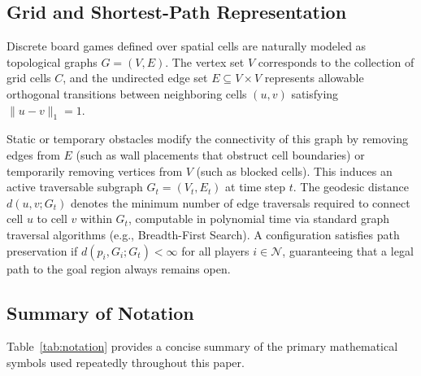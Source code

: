 \documentclass{article}
\begin{document}
\subsection{Grid and Shortest-Path Representation}
\label{subsec:prelim_grid_paths}

Discrete board games defined over spatial cells are naturally modeled as topological graphs $G = (V, E)$. The vertex set $V$ corresponds to the collection of grid cells $C$, and the undirected edge set $E \subseteq V \times V$ represents allowable orthogonal transitions between neighboring cells $(u, v)$ satisfying $\|u - v\|_1 = 1$.

Static or temporary obstacles modify the connectivity of this graph by removing edges from $E$ (such as wall placements that obstruct cell boundaries) or temporarily removing vertices from $V$ (such as blocked cells). This induces an active traversable subgraph $G_t = (V_t, E_t)$ at time step $t$. The geodesic distance $d(u, v; G_t)$ denotes the minimum number of edge traversals required to connect cell $u$ to cell $v$ within $G_t$, computable in polynomial time via standard graph traversal algorithms (e.g., Breadth-First Search). A configuration satisfies path preservation if $d(p_i, G_i; G_t) < \infty$ for all players $i \in \mathcal{N}$, guaranteeing that a legal path to the goal region always remains open.

\subsection{Summary of Notation}
\label{subsec:prelim_notation}

Table~\ref{tab:notation} provides a concise summary of the primary mathematical symbols used repeatedly throughout this paper.
\end{document}
